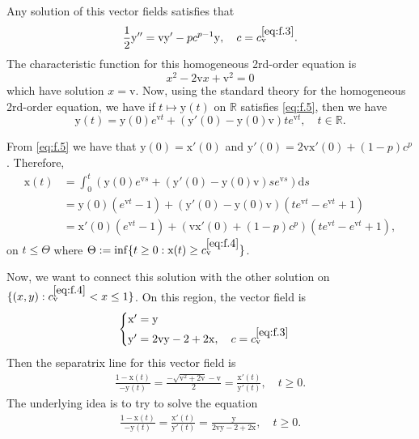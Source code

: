 \documentclass[12pt,a4paper]{amsart}
\numberwithin{equation}{section}
\theoremstyle{plain}
\theoremstyle{remark}
\begin{document}
Any solution of this vector fields satisfies that
\[
\frac{1}{2}\mathrm y'' = \mathrm v \mathrm y' -  pc^{p-1}\mathrm y, \quad c = c_\mathrm v^{\eqref{eq:f.3}}.
\]
The characteristic function for this homogeneous 2rd-order equation is \[x^2  - 2\mathrm v x + \mathrm v^2= 0\]
which have solution $x = \mathrm v$.
Now, using the standard theory for the homogeneous 2rd-order equation, we have if $t\mapsto \mathrm y(t)$ on $\mathbb R$ satisfies \eqref{eq:f.5}, then we have
\[
\mathrm y(t) = \mathrm y(0) e^{\mathrm v t} + (\mathrm y'(0) - \mathrm y(0)\mathrm v) te^{\mathrm vt}, \quad t\in \mathbb R.
\]

From \eqref{eq:f.5} we have that $\mathrm y(0) =\mathrm x'(0) $ and $\mathrm y'(0)= 2\mathrm v \mathrm x'(0) + (1-p)c^p$.
Therefore,
\begin{align}
\mathrm x(t) & = \int_0^t (\mathrm y(0)e^{\mathrm vs} + (\mathrm y'(0) - \mathrm y(0) \mathrm v) s e^{\mathrm vs}) \mathrm ds
\\& = \mathrm y(0) (e^{\mathrm v t} - 1) + (\mathrm y'(0) - \mathrm y(0) \mathrm v) (te^{\mathrm v t}-e^{\mathrm v t}+1)
\\& = \mathrm x'(0) (e^{\mathrm v t} - 1) + \left(\mathrm v \mathrm x'(0) + (1-p)c^p\right) (te^{\mathrm v t}-e^{\mathrm v t}+1),
\end{align}
on $t\leq \Theta$ where $\Theta:= \inf\{t\geq 0: \mathrm x(t) \geq c_\mathrm v^{\eqref{eq:f.4}}\}$.

Now, we want to connect this solution with the other solution on $\{(x,y): c_\mathrm v^{\eqref{eq:f.4}}< x \leq 1\}$. 
On this region, the vector field is
\begin{align}
\begin{cases}
\mathrm x' = \mathrm y \\
\mathrm y' = 2\mathrm v \mathrm y  - 2 + 2\mathrm x, \quad c = c_\mathrm v^{\eqref{eq:f.3}} 
\end{cases}
\end{align}
Then the separatrix line for this vector field is 
\begin{align}
\frac{1-\mathrm x(t)}{- \mathrm y(t)}=\frac{-\sqrt{\mathrm v^2 + 2 \mathrm v}-\mathrm v}{2} = \frac{\mathrm x'(t)}{\mathrm y'(t)}, \quad t\geq 0.
\end{align}
The underlying idea is to try to solve the equation
\begin{align}
\frac{1-\mathrm x(t)}{- \mathrm y(t)}=\frac{\mathrm x'(t)}{\mathrm y'(t)} = \frac{\mathrm y}{2\mathrm v\mathrm y-2+2\mathrm x}, \quad t\geq 0.
\end{align}
\end{document}
